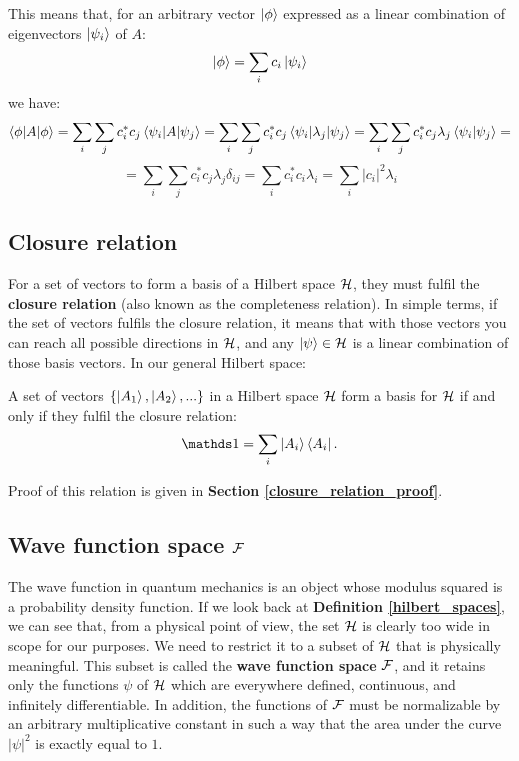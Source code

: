 This means that, for an arbitrary vector $\ket{\phi}$ expressed as a linear combination of eigenvectors $\ket{\psi_i}$ of $A$:
\begin{equation}
    \ket{\phi} = \sum_i c_i\ket{\psi_i}
\end{equation}
we have:
\begin{equation*}
    \braket{\phi|A|\phi} = \sum_i\sum_j c_i^*c_j\braket{\psi_i|A|\psi_j} = \sum_i\sum_j c_i^*c_j\braket{\psi_i|\lambda_j|\psi_j} = \sum_i\sum_j c_i^*c_j\lambda_j\braket{\psi_i|\psi_j} = 
\end{equation*}
\begin{equation} \label{expected_value}
    = \sum_i\sum_j c_i^*c_j\lambda_j\delta_{ij} = \sum_i c_i^*c_i\lambda_i = \sum_i |c_i|^2\lambda_i
\end{equation}

\subsection{Closure relation}

For a set of vectors to form a basis of a Hilbert space $\mathcal{H}$, they must fulfil the \textbf{closure relation} (also known as the completeness relation). In simple terms, if the set of vectors fulfils the closure relation, it means that with those vectors you can reach all possible directions in $\mathcal{H}$, and any $\ket{\psi}\in\mathcal{H}$ is a linear combination of those basis vectors. In our general Hilbert space:

\begin{definition}
    A set of vectors $\{\ket{A_1}, \ket{A_2}, ...\}$ in a Hilbert space $\mathcal{H}$ form a basis for $\mathcal{H}$ if and only if they fulfil the closure relation:
    \begin{equation}
        \Imat = \sum_i\ket{A_i} \bra{A_i}.
    \end{equation}
\end{definition}

Proof of this relation is given in \textbf{Section \ref{closure_relation_proof}}.

\subsection{Wave function space $\mathcal{F}$}

The wave function in quantum mechanics is an object whose modulus squared is a probability density function. If we look back at \textbf{Definition \ref{hilbert_spaces}}, we can see that, from a physical point of view, the set $\mathcal{H}$ is clearly too wide in scope for our purposes. We need to restrict it to a subset of $\mathcal{H}$ that is physically meaningful. This subset is called the \textbf{wave function space} $\mathcal{F}$, and it retains only the functions $\psi$ of $\mathcal{H}$ which are everywhere defined, continuous, and infinitely differentiable. In addition, the functions of $\mathcal{F}$ must be normalizable by an arbitrary multiplicative constant in such a way that the area under the curve $|\psi|^2$ is exactly equal to $1$.

